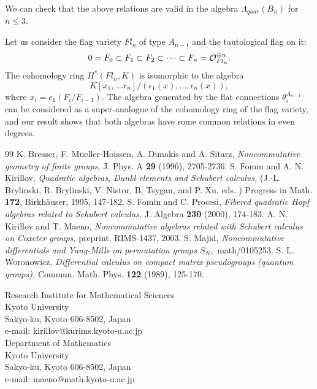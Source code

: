 We can check that the above relations are 
valid in the algebra $\Lambda_{quar}(B_n)$ for $n\leq 3.$ 
\begin{rem}
{\rm Let us consider the flag variety $Fl_n$ of type $A_{n-1}$ 
and the tautological flag on it: 
\[ 0=F_0 \subset F_1 \subset F_2 \subset \cdots \subset F_n = 
{\cal O}_{Fl_n}^{\oplus n}. \] 
The cohomology ring $H^*(Fl_n,K)$ is isomorphic to the algebra 
\[ K[x_1,\ldots x_n]/(\epsilon_1(x),\ldots ,\epsilon_n(x)), \] 
where $x_i=c_1(F_i/F_{i-1}).$ The algebra generated by the flat 
connections $\theta_i^{A_{n-1}}$ can be considered as a super-analogue 
of the cohomology ring of the flag variety, and our result shows 
that both algebras have some common relations in even degrees. }
\end{rem}
\begin{thebibliography}{99}
 K. Bresser, F. Mueller-Hoissen, A. Dimakis and A. Sitarz, 
{\it Noncommutative geometry of finite groups,} J. Phys. A {\bf 29} (1996), 
2705-2736. 
 S. Fomin and A. N. Kirillov, {\it Quadratic 
algebras, Dunkl elements and Schubert calculus,} (J.-L. 
Brylinski, R. Brylinski, V. Nistor, B. Tsygan, and P. Xu, eds. ) 
Progress in Math. {\bf 172}, Birkh\"auser, 1995, 147-182. 
 S. Fomin and C. Procesi, {\it Fibered quadratic 
Hopf algebras related to Schubert calculus,} J. Algebra 
{\bf 230} (2000), 174-183. 
 A. N. Kirillov and T. Maeno, {\it Noncommutative 
algebras related with Schubert calculus on Coxeter groups,} 
preprint, RIMS-1437, 2003. 
 S. Majid, {\it Noncommutative differentials and 
Yang-Mills on permutation groups $S_N,$} math/0105253. 
 S. L. Woronowicz, {\it Differential calculus 
on compact matrix pseudogroups (quantum groups),} Commun. Math. 
Phys. {\bf 122} (1989), 125-170. 
\end{thebibliography}
Research Institute for Mathematical Sciences \\ 
Kyoto University \\
Sakyo-ku, Kyoto 606-8502, Japan \\
e-mail: kirillov@kurims.kyoto-u.ac.jp 
\bigskip \\ 
Department of Mathematics \\ 
Kyoto University \\ 
Sakyo-ku, Kyoto 606-8502, Japan \\ 
e-mail: maeno@math.kyoto-u.ac.jp 


